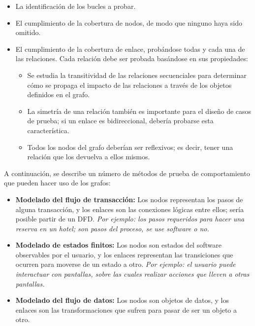 \begin{itemize}
    \item La identificación de los bucles a probar.
    \item El cumplimiento de la cobertura de nodos, de modo que ninguno haya sido omitido.
    \item El cumplimiento de la cobertura de enlace, probándose todas y cada una de las relaciones. Cada relación debe ser probada basándose en sus propiedades:
    \begin{itemize}
        \item Se estudia la transitividad de las relaciones secuenciales para determinar cómo se propaga el impacto de las relaciones a través de los objetos definidos en el grafo.
        \item La simetría de una relación también es importante para el diseño de casos de prueba; si un enlace es bidireccional, debería probarse esta característica.
        \item Todos los nodos del grafo deberían ser reflexivos; es decir, tener una relación que los devuelva a ellos mismos. %
    \end{itemize}
\end{itemize}

A continuación, se describe un número de métodos de prueba de comportamiento que pueden hacer uso de los grafos:

\begin{itemize}
    \item \textbf{Modelado del flujo de transacción:} Los nodos representan los pasos de alguna transacción, y los enlaces son las conexiones lógicas entre ellos; sería posible partir de un DFD. \textit{Por ejemplo: los pasos requeridos para hacer una reserva en un hotel; son pasos del proceso, se use software o no.}
    \item \textbf{Modelado de estados finitos:} Los nodos son estados del software observables por el usuario, y los enlaces representan las transiciones que ocurren para moverse de un estado a otro. \textit{Por ejemplo: el usuario puede interactuar con pantallas, sobre las cuales realizar acciones que lleven a otras pantallas.}
    \item \textbf{Modelado del flujo de datos:} Los nodos son objetos de datos, y los enlaces son las transformaciones que sufren para pasar de ser un objeto a otro.
\end{itemize}


